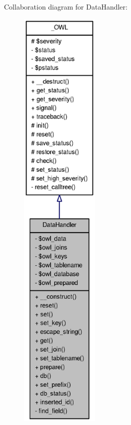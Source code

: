 Collaboration diagram for DataHandler:
\nopagebreak
\begin{figure}[H]
\begin{center}
\leavevmode
\includegraphics[height=600pt]{classDataHandler__coll__graph}
\end{center}
\end{figure}
